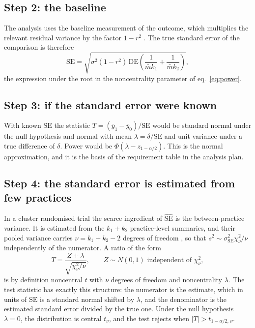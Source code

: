 \documentclass[11pt,a4paper]{article}
\begin{document}
\subsection*{Step 2: the baseline}

The analysis uses the baseline measurement of the outcome, which multiplies
the relevant residual variance by the factor $1-r^2$ \citep{borm2007}. The
true standard error of the comparison is therefore
\begin{equation}
\label{eq:se}
\mathrm{SE} = \sqrt{\sigma^2 (1-r^2)\,\mathrm{DE}
\left( \frac{1}{\bar m k_1} + \frac{1}{\bar m k_2} \right)},
\end{equation}
the expression under the root in the noncentrality parameter of
eq.~\eqref{eq:power}.

\subsection*{Step 3: if the standard error were known}

With known $\mathrm{SE}$ the statistic $T = (\bar y_1 - \bar
y_0)/\mathrm{SE}$ would be standard normal under the null hypothesis and
normal with mean $\lambda = \delta/\mathrm{SE}$ and unit variance under a
true difference of $\delta$. Power would be $\Phi(\lambda - z_{1-\alpha/2})$.
This is the normal approximation, and it is the basis of the requirement
table in the analysis plan.

\subsection*{Step 4: the standard error is estimated from few practices}

In a cluster randomised trial the scarce ingredient of
$\widehat{\mathrm{SE}}$ is the between-practice variance. It is estimated
from the $k_1 + k_2$ practice-level summaries, and their pooled variance
carries $\nu = k_1 + k_2 - 2$ degrees of freedom
\citep[section~10.3.1]{hayes2017}, so that $s^2 \sim \sigma^2_{\mathrm{SE}}
\chi^2_\nu / \nu$ independently of the numerator. A ratio of the form
\begin{equation}
T = \frac{Z + \lambda}{\sqrt{\chi^2_\nu / \nu}},
\qquad Z \sim N(0,1) \text{ independent of } \chi^2_\nu,
\end{equation}
is by definition noncentral $t$ with $\nu$ degrees of freedom and
noncentrality $\lambda$. The test statistic has exactly this structure: the
numerator is the estimate, which in units of $\mathrm{SE}$ is a standard
normal shifted by $\lambda$, and the denominator is the estimated standard
error divided by the true one. Under the null hypothesis $\lambda = 0$, the
distribution is central $t_\nu$, and the test rejects when $|T| >
t_{1-\alpha/2,\,\nu}$.
\end{document}

